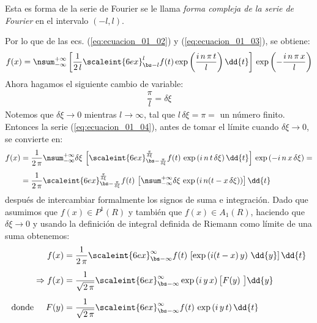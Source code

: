 Esta es forma de la serie de Fourier se le llama \emph{forma compleja de la serie de Fourier} en el intervalo $(-l , l)$.
\par
Por lo que de las ecs. (\ref{eq:ecuacion_01_02}) y (\ref{eq:ecuacion_01_03}), se obtiene:
\begin{align}
f (x) = \nsum_{-\infty}^{+\infty} \left[ \dfrac{1}{2 \, l} \scaleint{6ex}_{\bs -l}^{l} f (t) \exp \left( \dfrac{i \, n \, \pi \, t}{l} \right) \dd{t} \right] \, \exp \left( - \dfrac{i \, n \, \pi \, x}{l} \right)
\label{eq:ecuacion_01_04}
\end{align}
Ahora hagamos el siguiente cambio de variable:
\begin{align*}
\dfrac{\pi}{l} = \delta \xi
\end{align*}
Notemos que $\delta \xi \to 0$ mientras $l \to \infty$, tal que $l \, \delta \xi = \pi =$ un número finito. Entonces la serie (\ref{eq:ecuacion_01_04}), antes de tomar el límite cuando $\delta \xi \to 0$, se convierte en:
\begin{align*}
f (x) &= \dfrac{1}{2 \, \pi} \nsum_{-\infty}^{+\infty} \delta \xi \, \left[ \scaleint{6ex}_{\bs -\frac{\pi}{\delta \xi}}^{\frac{\pi}{\delta \xi}} f (t) \, \exp \left( i \, n \, t \, \delta \xi \right) \dd{t} \right] \, \exp \left( - i \, n \, x \, \delta \xi \right) = \\[0.5em]
&= \dfrac{1}{2 \, \pi} \scaleint{6ex}_{\bs -\frac{\pi}{\delta \xi}}^{\frac{\pi}{\delta \xi}} f (t) \, \left[ \nsum_{-\infty}^{+\infty} \delta \xi \, \exp \left( i \, n (t - x \, \delta \xi) \right) \right] \dd{t}
\end{align*}
después de intercambiar formalmente los signos de suma e integración. Dado que asumimos que  $f (x) \in P^{1} (R)$ y también que $f (x) \in A_{1} (R)$, haciendo que $\delta \xi \to 0$ y usando la definición de integral definida de Riemann como límite de una suma obtenemos:
\begin{align}
f (x) &= \dfrac{1}{2 \, \pi} \scaleint{6ex}_{\bs -\infty}^{\infty} f (t) \, \left[ \exp \left( i (t - x) \, y \right) \, \dd{y} \right] \dd{t} \label{eq:ecuacion_01_05} \\[0.5em]
\Rightarrow f (x) &= \dfrac{1}{\sqrt{2 \, \pi}} \scaleint{6ex}_{\bs -\infty}^{\infty} \exp \left( i \, y \, x \right) \big[ F (y) \big] \dd{y} \label{eq:ecuacion_01_06} \\[0.5em]
\mbox{donde} \hspace{0.5cm} F (y) &= \dfrac{1}{\sqrt{2 \, \pi}} \scaleint{6ex}_{\bs -\infty}^{\infty} f (t) \, \exp \left( i \, y \, t \right) \dd{t} \label{eq:ecuacion_01_07}
\end{align}
